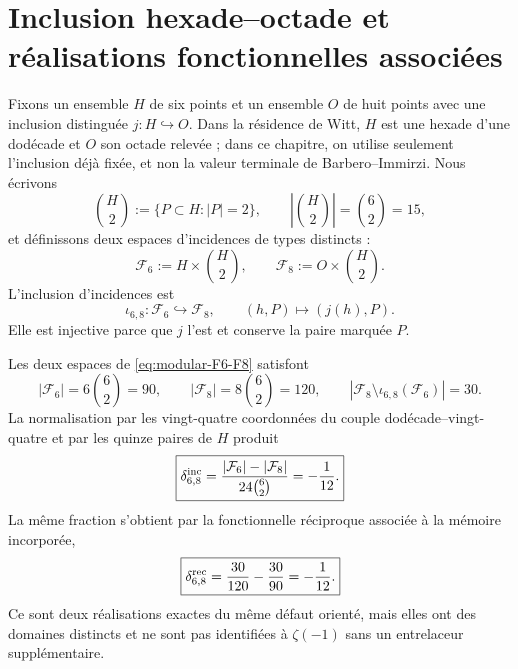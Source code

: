 \label{ch:modular}

\section{Inclusion hexade--octade et réalisations fonctionnelles associées}

Fixons un ensemble \(H\) de six points et un ensemble \(O\) de huit
points avec une inclusion distinguée \(j:H\hookrightarrow O\). Dans la
résidence de Witt, \(H\) est une hexade d'une dodécade et \(O\) son octade
relevée ; dans ce chapitre, on utilise seulement l'inclusion déjà fixée, et non la
valeur terminale de Barbero--Immirzi. Nous écrivons
\begin{equation}
\label{eq:modular-pairs-H}
\binom H2:=\{P\subset H:|P|=2\},
\qquad \left|\binom H2\right|=\binom62=15,
\end{equation}
et définissons deux espaces d'incidences de types distincts :
\begin{equation}
\label{eq:modular-F6-F8}
\mathcal F_6:=H\times\binom H2,
\qquad
\mathcal F_8:=O\times\binom H2.
\end{equation}
L'inclusion d'incidences est
\begin{equation}
\label{eq:modular-iota68}
\iota_{6,8}:\mathcal F_6\hookrightarrow\mathcal F_8,
\qquad
(h,P)\longmapsto(j(h),P).
\end{equation}
Elle est injective parce que \(j\) l'est et conserve la paire marquée \(P\).

\begin{theorem}
\label{thm:modular-incidence-90-120}
Les deux espaces de \cref{eq:modular-F6-F8} satisfont
\begin{equation}
\label{eq:modular-counts-90-120}
|\mathcal F_6|=6\binom62=90,
\qquad
|\mathcal F_8|=8\binom62=120,
\qquad
|\mathcal F_8\setminus\iota_{6,8}(\mathcal F_6)|=30.
\end{equation}
La normalisation par les vingt-quatre coordonnées du couple
dodécade--vingt-quatre et par les quinze paires de \(H\) produit
\begin{equation}
\label{eq:modular-incidence-defect}
\boxed{
\delta_{6,8}^{\rm inc}
=\frac{|\mathcal F_6|-|\mathcal F_8|}
{24\binom62}=-\frac1{12}.}
\end{equation}
La même fraction s'obtient par la fonctionnelle réciproque associée
à la mémoire incorporée,
\begin{equation}
\label{eq:modular-reciprocal-defect}
\boxed{
\delta_{6,8}^{\rm rec}
=\frac{30}{120}-\frac{30}{90}=-\frac1{12}.}
\end{equation}
Ce sont deux réalisations exactes du même défaut orienté, mais elles ont
des domaines distincts et ne sont pas identifiées à \(\zeta(-1)\) sans un
entrelaceur supplémentaire.
\end{theorem}

